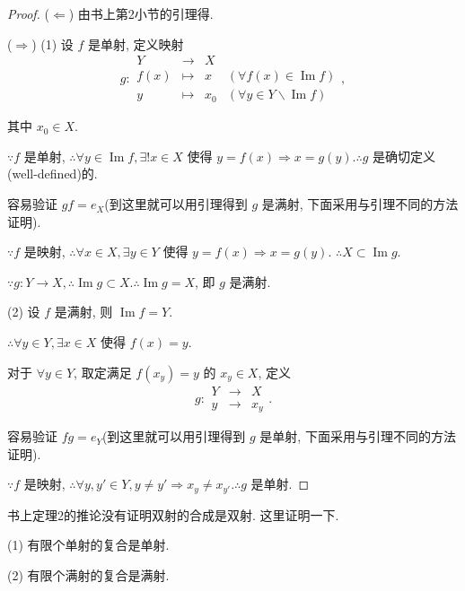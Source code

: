 \documentclass{ctexart}
\begin{document}
\begin{proof}
    ($\Leftarrow$) 由书上第2小节的引理得.
    
    ($\Rightarrow$) (1) 设 $f$ 是单射, 定义映射
    \[g:\begin{array}{rcll}
    Y & \to & X \\
    f(x) & \mapsto & x & (\forall f(x)\in\operatorname{Im}f) \\
    y & \mapsto & x_0 & (\forall y\in Y\backslash\operatorname{Im}f)
    \end{array},\]

    其中 $x_0\in X$.

    $\because f$ 是单射, $\therefore\forall y\in\operatorname{Im}f,\exists!x\in X$ 使得 $y=f(x)\Rightarrow x=g(y).\therefore g$ 是确切定义(well-defined)的.

    容易验证 $gf=e_X$(到这里就可以用引理得到 $g$ 是满射, 下面采用与引理不同的方法证明).

    $\because f$ 是映射, $\therefore\forall x\in X,\exists y\in Y$ 使得 $y=f(x)\Rightarrow x=g(y)$. $\therefore X\subset\operatorname{Im}g$.

    $\because g:Y\to X,\therefore\operatorname{Im}g\subset X.\therefore\operatorname{Im}g=X$, 即 $g$ 是满射.

    (2) 设 $f$ 是满射, 则 $\operatorname{Im}f=Y$.

    $\therefore\forall y\in Y,\exists x\in X$ 使得 $f(x)=y$.

    对于 $\forall y\in Y$, 取定满足 $f(x_y)=y$ 的 $x_y\in X$, 定义
    \[g:\begin{array}{rcl}
    Y & \to & X \\
    y & \to & x_y
    \end{array}.\]

    容易验证 $fg=e_Y$(到这里就可以用引理得到 $g$ 是单射, 下面采用与引理不同的方法证明).

    $\because f$ 是映射, $\therefore\forall y,y'\in Y,y\neq y'\Rightarrow x_y\neq x_{y'}.\therefore g$ 是单射.
\end{proof}
书上定理2的推论没有证明双射的合成是双射. 这里证明一下.
\begin{theorem}
    (1) 有限个单射的复合是单射.
    
    (2) 有限个满射的复合是满射.
\end{theorem}
\end{document}
